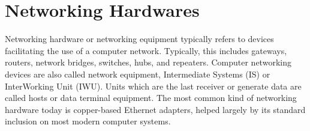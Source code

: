 \chapter{Networking Hardwares}

Networking hardware or networking equipment typically refers to devices facilitating the use of a computer network. 
Typically, this includes gateways, routers, network bridges, switches, hubs, and repeaters. 
Computer networking devices are also called network equipment, Intermediate Systems (IS) or InterWorking Unit (IWU).
Units which are the last receiver or generate data are called hosts or data terminal equipment.
The most common kind of networking hardware today is copper-based Ethernet adapters, helped largely by its standard inclusion on most modern computer systems.








